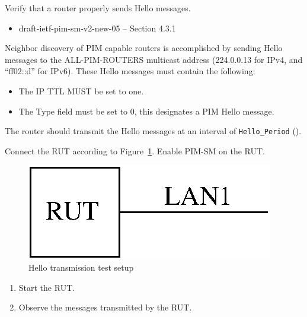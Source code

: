 \documentclass[11pt]{report}
\begin{document}
Verify that a router properly sends Hello messages.

\begin{itemize}
  \item draft-ietf-pim-sm-v2-new-05 -- Section 4.3.1
\end{itemize}

Neighbor discovery of PIM capable routers is accomplished by sending Hello
messages to the ALL-PIM-ROUTERS multicast address (224.0.0.13 for IPv4,
and ``ff02::d'' for IPv6). These Hello messages must contain the following:
\begin{itemize}

  \item The IP TTL MUST be set to one.

  \item The Type field must be set to 0, this designates a PIM Hello message.

\end{itemize}

The router should transmit the Hello messages at an interval of
\verb=Hello_Period= ({\PimsmHelloPeriod}).

Connect the RUT according to Figure~\ref{fig:hello_transmission}.
Enable PIM-SM on the RUT.

\begin{figure}[htbp]
  \begin{center}
    \includegraphics[scale=0.8]{figs/pim_test_2_1_hello_transmission}
    \caption{Hello transmission test setup}
    \label{fig:hello_transmission}
  \end{center}
\end{figure}

\begin{enumerate}

  \item Start the RUT.

  \item Observe the messages transmitted by the RUT.

\end{enumerate}
\end{document}

